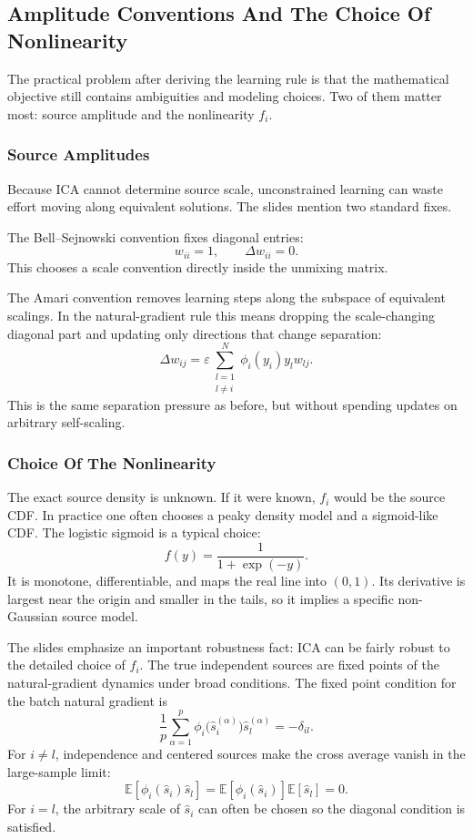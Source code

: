 \subsection{Amplitude Conventions And The Choice Of Nonlinearity}

The practical problem after deriving the learning rule is that the mathematical objective still contains ambiguities and modeling choices. Two of them matter most: source amplitude and the nonlinearity \(f_i\).

\subsubsection{Source Amplitudes}

Because ICA cannot determine source scale, unconstrained learning can waste effort moving along equivalent solutions. The slides mention two standard fixes.

The Bell--Sejnowski convention fixes diagonal entries:
\[
  w_{ii}=1,
  \qquad
  \Delta w_{ii}=0.
\]
This chooses a scale convention directly inside the unmixing matrix.

The Amari convention removes learning steps along the subspace of equivalent scalings. In the natural-gradient rule this means dropping the scale-changing diagonal part and updating only directions that change separation:
\[
  \Delta w_{ij}
  =
  \varepsilon
  \sum_{\substack{l=1\\ l\ne i}}^{N}
  \phi_i(y_i)y_l w_{lj}.
\]
This is the same separation pressure as before, but without spending updates on arbitrary self-scaling.

\subsubsection{Choice Of The Nonlinearity}

The exact source density is unknown. If it were known, \(f_i\) would be the source CDF. In practice one often chooses a peaky density model and a sigmoid-like CDF. The logistic sigmoid is a typical choice:
\[
  f(y)=\frac{1}{1+\exp(-y)}.
\]
It is monotone, differentiable, and maps the real line into \((0,1)\). Its derivative is largest near the origin and smaller in the tails, so it implies a specific non-Gaussian source model.

The slides emphasize an important robustness fact: ICA can be fairly robust to the detailed choice of \(f_i\). The true independent sources are fixed points of the natural-gradient dynamics under broad conditions. The fixed point condition for the batch natural gradient is
\[
  \frac{1}{p}
  \sum_{\alpha=1}^{p}
  \phi_i\bigl(\hat{s}_i^{(\alpha)}\bigr)
  \hat{s}_l^{(\alpha)}
  =
  -\delta_{il}.
\]
For \(i\ne l\), independence and centered sources make the cross average vanish in the large-sample limit:
\[
  \mathbb{E}
  \left[
    \phi_i(\hat{s}_i)\hat{s}_l
  \right]
  =
  \mathbb{E}[\phi_i(\hat{s}_i)]
  \mathbb{E}[\hat{s}_l]
  =
  0.
\]
For \(i=l\), the arbitrary scale of \(\hat{s}_i\) can often be chosen so the diagonal condition is satisfied.

